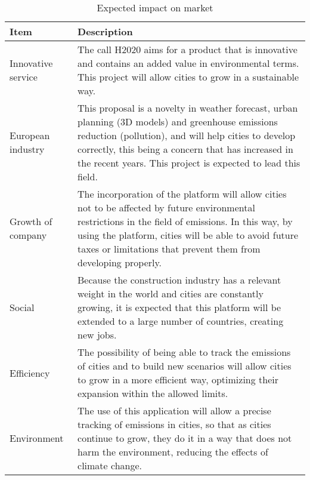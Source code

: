 \begin{table}[H]
	\centering
	\begin{tabular}{l p{11cm}}
		
		\toprule[2pt]
		
		\textbf{Item} &  \textbf{Description}\\
		
		\midrule [1.5pt]
		
		Innovative service & The call H2020 aims for a product that is innovative and contains an added value in environmental terms. This project will allow cities to grow in a sustainable way.\vspace{0.2cm}\\
		
		\midrule
		
		European industry & This proposal is a novelty in weather forecast, urban planning (3D models) and greenhouse emissions reduction (pollution), and will help cities to develop correctly, this being a concern that has increased in the recent years. This project is expected to lead this field.\vspace{0.2cm}\\
		
		\midrule
		
		Growth of company & The incorporation of the platform will allow cities not to be affected by future environmental restrictions in the field of emissions. In this way, by using the platform, cities will be able to avoid future taxes or limitations that prevent them from developing properly.\vspace{0.2cm}\\
		
		\midrule
		
		Social & Because the construction industry has a relevant weight in the world and cities are constantly growing, it is expected that this platform will be extended to a large number of countries, creating new jobs.\vspace{0.2cm}\\
		
		\midrule
		
		Efficiency & The possibility of being able to track the emissions of cities and to build new scenarios will allow cities to grow in a more efficient way, optimizing their expansion within the allowed limits.\vspace{0.2cm}\\
		
		\midrule
		
		Environment & The use of this application will allow a precise tracking of emissions in cities, so that as cities continue to grow, they do it in a way that does not harm the environment, reducing the effects of climate change.\vspace{0.2cm}\\
		
		\bottomrule[2pt]
		
	\end{tabular}
	\caption{Expected impact on market}
\end{table}


